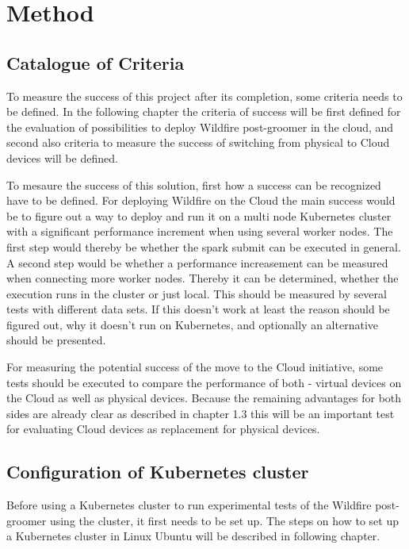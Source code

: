 
\chapter{Method}

\section{Catalogue of Criteria}

To measure the success of this project after its completion, some criteria needs to be defined. In the following chapter the criteria of success will be first defined for the evaluation of possibilities to deploy Wildfire post-groomer in the cloud, and second also criteria to measure the success of switching from physical to Cloud devices will be defined.

To mesaure the success of this solution, first how a success can be recognized have to be defined.
For deploying Wildfire on the Cloud the main success would be to figure out a way to deploy and run it on a multi node Kubernetes cluster with a significant performance increment when using several worker nodes. The first step would thereby be whether the spark submit can be executed in general. A second step would be whether a performance increasement can be measured when connecting more worker nodes. Thereby it can be determined, whether the execution runs in the cluster or just local. This should be measured by several tests with different data sets. If this doesn't work at least the reason should be figured out, why it doesn't run on Kubernetes, and optionally an alternative should be presented.

For measuring the potential success of the move to the Cloud initiative, some tests should be executed to compare the performance of both - virtual devices on the Cloud as well as physical devices. Because the remaining advantages for both sides are already clear as described in chapter 1.3 this will be an important test for evaluating Cloud devices as replacement for physical devices.

\section{Configuration of Kubernetes cluster}

Before using a Kubernetes cluster to run experimental tests of the Wildfire post-groomer using the cluster, it first needs to be set up. The steps on how to set up a Kubernetes cluster in Linux Ubuntu will be described in following chapter.

